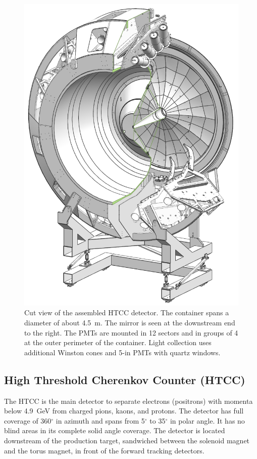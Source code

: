 \documentclass[final,3p]{elsarticle}
\begin{document}
\begin{twocolumn}
\begin{figure}[htbp!]
\centerline{\includegraphics[width=0.9\columnwidth]{htcc-view-3.png}}
\caption{Cut view of the assembled HTCC detector. The container spans a diameter of about 4.5~m. The mirror is
seen at the downstream end to the right. The PMTs are mounted in 12 sectors and in groups of 4 at the outer
perimeter of the container. Light collection uses additional Winston cones and 5-in PMTs with quartz windows.}
\label{HTCC-container}
\end{figure}

\subsection{High Threshold Cherenkov Counter (HTCC)}

The HTCC is the main detector to separate electrons (positrons) with momenta below 4.9~GeV from charged pions,
kaons, and protons. The detector has full coverage of 360$^\circ$ in azimuth and spans from 5$^\circ$ to 35$^\circ$
in polar angle. It has no blind areas in its complete solid angle coverage. The detector is located downstream of the
production target, sandwiched between the solenoid magnet and the torus magnet, in front of the forward tracking
detectors. 


\end{twocolumn}
\end{document}
